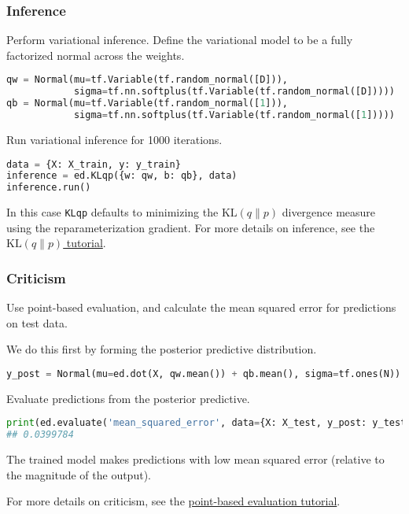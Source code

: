 \subsubsection{Inference}

Perform variational inference.
Define the variational model to be a fully factorized normal across
the weights.
\begin{lstlisting}[language=Python]
qw = Normal(mu=tf.Variable(tf.random_normal([D])),
            sigma=tf.nn.softplus(tf.Variable(tf.random_normal([D]))))
qb = Normal(mu=tf.Variable(tf.random_normal([1])),
            sigma=tf.nn.softplus(tf.Variable(tf.random_normal([1]))))
\end{lstlisting}

Run variational inference for 1000 iterations.
\begin{lstlisting}[language=Python]
data = {X: X_train, y: y_train}
inference = ed.KLqp({w: qw, b: qb}, data)
inference.run()
\end{lstlisting}
In this case \texttt{KLqp} defaults to minimizing the
$\text{KL}(q\|p)$ divergence measure using the reparameterization
gradient.
For more details on inference, see the \href{/tutorials/klqp}{$\text{KL}(q\|p)$ tutorial}.


\subsubsection{Criticism}

Use point-based evaluation, and calculate the mean squared
error for predictions on test data.

We do this first by forming the posterior predictive distribution.
\begin{lstlisting}[language=Python]
y_post = Normal(mu=ed.dot(X, qw.mean()) + qb.mean(), sigma=tf.ones(N))
\end{lstlisting}

Evaluate predictions from the posterior predictive.
\begin{lstlisting}[language=Python]
print(ed.evaluate('mean_squared_error', data={X: X_test, y_post: y_test}))
## 0.0399784
\end{lstlisting}

The trained model makes predictions with low mean squared error
(relative to the magnitude of the output).

For more details on criticism, see the
\href{/tutorials/point-evaluation}{point-based
evaluation tutorial}.
